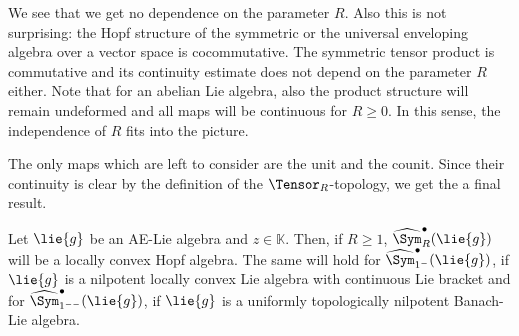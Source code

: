 \begin{remark}
	We see that we get no dependence on the parameter $R$. Also this is not 
	surprising: the Hopf structure of the symmetric or the universal enveloping 
	algebra over a vector space is cocommutative. The symmetric tensor product is 
	commutative and its continuity estimate does not depend on the parameter $R$ 
	either. Note that for an abelian Lie algebra, also the product structure will 
	remain undeformed and all maps will be continuous for $R \geq 0$. In this 
	sense, the independence of $R$ fits into the picture.
\end{remark}


The only maps which are left to consider are the unit and the counit. Since their 
continuity is clear by the definition of the $\Tensor_R$-topology, we get the 
a final result.
\begin{theorem}
    \label{Prop:Hopf:ContinuousHopf}%
    Let $\lie{g}$ be an AE-Lie algebra and $z \in \mathbb{K}$. Then, 
    if $R \geq 1$, $\widehat{\Sym}_R^\bullet (\lie{g})$ will be a locally convex 
    Hopf algebra. The same will hold for $\widehat{\Sym}_{1^-}^{\bullet}
    (\lie{g})$, if $\lie{g}$ is a nilpotent locally convex Lie algebra with 
    continuous Lie bracket and for $\widehat{\Sym}_{1^{--}}^{\bullet}(\lie{g})$, 
    if $\lie{g}$ is a uniformly topologically nilpotent Banach-Lie algebra.
\end{theorem}
